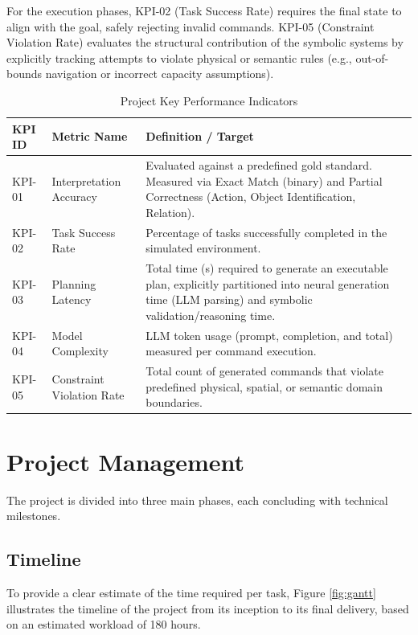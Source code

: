 \documentclass[a4paper]{article}
\begin{document}
For the execution phases, KPI-02 (Task Success Rate) requires the final state to align with the goal, safely rejecting invalid commands. KPI-05 (Constraint Violation Rate) evaluates the structural contribution of the symbolic systems by explicitly tracking attempts to violate physical or semantic rules (e.g., out-of-bounds navigation or incorrect capacity assumptions).

\begin{table}[htbp]
    \centering
    \footnotesize
    \renewcommand{\arraystretch}{1.4}
    \caption{Project Key Performance Indicators}
    \label{tab:kpis}
    \begin{tabularx}{\textwidth}{@{} l l X @{}}
        \toprule
        \textbf{KPI ID} & \textbf{Metric Name} & \textbf{Definition / Target} \\
        \midrule
        KPI-01 & Interpretation Accuracy & Evaluated against a predefined gold standard. Measured via Exact Match (binary) and Partial Correctness (Action, Object Identification, Relation). \\

        KPI-02 & Task Success Rate & Percentage of tasks successfully completed in the simulated environment. \\

        KPI-03 & Planning Latency & Total time (s) required to generate an executable plan, explicitly partitioned into neural generation time (LLM parsing) and symbolic validation/reasoning time. \\
        
        KPI-04 & Model Complexity & LLM token usage (prompt, completion, and total) measured per command execution. \\

        KPI-05 & Constraint Violation Rate & Total count of generated commands that violate predefined physical, spatial, or semantic domain boundaries. \\
        \bottomrule
    \end{tabularx}
\end{table}

\section{Project Management} 
The project is divided into three main phases, each concluding with technical milestones.

\subsection{Timeline}
To provide a clear estimate of the time required per task, Figure \ref{fig:gantt} illustrates the timeline of the project from its inception to its final delivery, based on an estimated workload of 180 hours.
\end{document}
